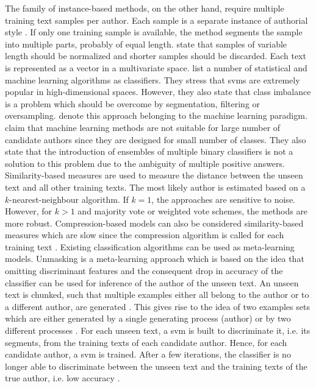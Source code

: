 The family of instance-based methods, on the other hand, require multiple training text samples per author. 
Each sample is a separate instance of authorial style \citep{stamatatos_survey_2009,altakrori_topic_2021,elmanarelbouanani_authorship_2014,neal_surveying_2018}.
If only one training sample is available, the method segments the sample into multiple parts, probably of equal length.
\citet{stamatatos_survey_2009} state that samples of variable length should be normalized and 
shorter samples should be discarded.
Each text is represented as a vector in a multivariate space.
\citet{stamatatos_survey_2009} list a number of statistical and machine learning algorithms as classifiers.
They stress that \acp{svm} are extremely popular in high-dimensional spaces.
However, they also state that class imbalance is a problem 
which should be overcome by segmentation, filtering or oversampling.
\citet{koppel_authorship_2011,koppel_determining_2014} denote this approach belonging to the machine learning paradigm.
\citet{koppel_determining_2014} claim that machine learning methods are not suitable for large number of candidate authors 
since they are designed for small number of classes. 
They also state that the introduction of ensembles of multiple binary classifiers is not a solution to this problem 
due to the ambiguity of multiple positive answers.
Similarity-based measures are used to measure the distance between the unseen text and all other training texts.
The most likely author is estimated based on a $k$-nearest-neighbour algorithm.
If $k=1$, the approaches are sensitive to noise.
However, for $k>1$ and majority vote or weighted vote schemes, the methods are more robust.
Compression-based models can also be considered similarity-based measures which are slow 
since the compression algorithm is called for each training text \citep{stamatatos_survey_2009,neal_surveying_2018}.
Existing classification algorithms can be used as meta-learning models.
Unmasking is a meta-learning approach which is based on the idea that
omitting discriminant features and the consequent drop in accuracy of the classifier 
can be used for inference of the author of the unseen text.
An unseen text is chunked, such that multiple examples either all belong to the author or to a different author, 
are generated \citep{koppel_authorship_2004}.
This gives rise to the idea of two examples sets which are either generated by a single generating process (author) 
or by two different processes \citep{koppel_authorship_2004}.
For each unseen text, a \ac{svm} is built to discriminate it, i.e. its segments, 
from the training texts of each candidate author.
Hence, for each candidate author, a \ac{svm} is trained.
After a few iterations, the classifier is no longer able to discriminate between the unseen text and 
the training texts of the true author, i.e. low accuracy \citep{stamatatos_survey_2009,koppel_authorship_2004}.


